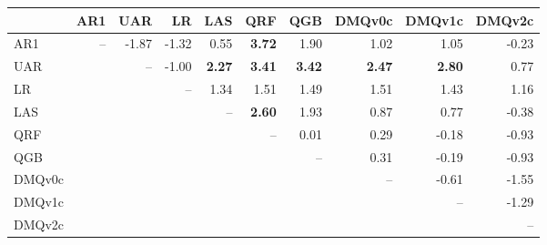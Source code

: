 \begin{tabular}{lrrrrrrrrr}
\toprule
 & AR1 & UAR & LR & LAS & QRF & QGB & DMQv0c & DMQv1c & DMQv2c \\
\midrule
AR1 & -- & -1.87 & -1.32 & 0.55 & \textbf{3.72} & 1.90 & 1.02 & 1.05 & -0.23 \\
UAR &  & -- & -1.00 & \textbf{2.27} & \textbf{3.41} & \textbf{3.42} & \textbf{2.47} & \textbf{2.80} & 0.77 \\
LR &  &  & -- & 1.34 & 1.51 & 1.49 & 1.51 & 1.43 & 1.16 \\
LAS &  &  &  & -- & \textbf{2.60} & 1.93 & 0.87 & 0.77 & -0.38 \\
QRF &  &  &  &  & -- & 0.01 & 0.29 & -0.18 & -0.93 \\
QGB &  &  &  &  &  & -- & 0.31 & -0.19 & -0.93 \\
DMQv0c &  &  &  &  &  &  & -- & -0.61 & -1.55 \\
DMQv1c &  &  &  &  &  &  &  & -- & -1.29 \\
DMQv2c &  &  &  &  &  &  &  &  & -- \\
\bottomrule
\end{tabular}
